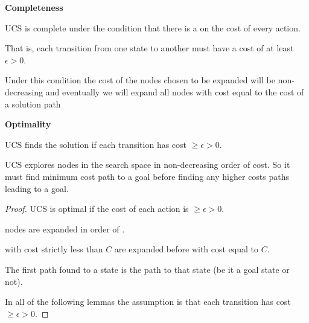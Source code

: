 \begin{listu}
    \item \textbf{Completeness}

    \begin{listu}
        \item UCS is complete under the condition that there is a  on the cost of every action.

        That is, each transition from one state to another must have a cost of at least $\epsilon > 0$.

        \item Under  this condition the cost of the nodes chosen to be expanded will be non-decreasing and eventually we will expand all nodes with cost equal to the cost of a solution path
    \end{listu}

    \item \textbf{Optimality}

    \begin{listu}
        \item UCS finds the  solution if each transition has cost $\ge \epsilon > 0$.

        \item UCS explores nodes in the search space in non-decreasing order of cost. So it must find minimum cost path to a goal before finding any higher costs paths leading to a goal.
    \end{listu}

    \begin{proof}
        UCS is optimal if the cost of each action is $\ge \epsilon > 0$.

        \begin{remark}[Intuition]
            \begin{listu}
                \item nodes are expanded in order of .
                \item {} with cost strictly less than $C$ are expanded before  with cost equal to $C$.
                \item The first path found to a state is the  path to that state (be it a goal state or not).
            \end{listu}
        \end{remark}

        In all of the following lemmas the assumption is that each transition has cost $\ge \epsilon > 0$.


\end{proof}
\end{listu}

